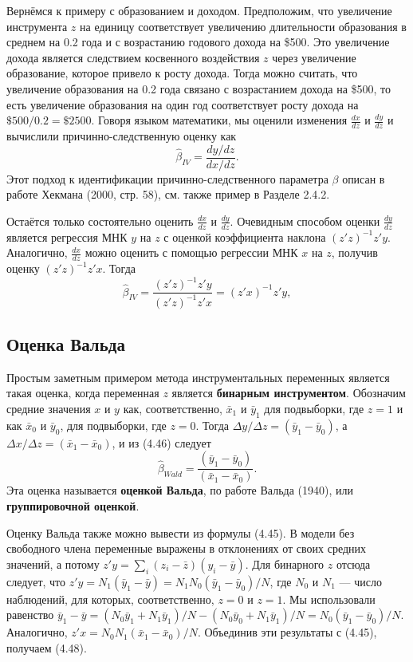 Вернёмся к примеру с образованием и доходом. Предположим, что увеличение инструмента $z$ на единицу соответствует  увеличению длительности образования в среднем на 0.2 года и с возрастанию годового дохода на \$500. Это увеличение дохода является следствием косвенного воздействия $z$ через увеличение образование, которое привело к росту дохода. Тогда можно считать, что увеличение образования на 0.2 года связано с возрастанием дохода на \$500, то есть увеличение образования на один год соответствует росту дохода на $\$500/0.2 = \$2500$. Говоря языком математики, мы оценили изменения $\frac{dx}{dz}$ и $\frac{dy}{dz}$ и вычислили причинно-следственную оценку как
\begin{equation}
\hat{\beta}_{IV} = \frac{dy/dz}{dx/dz}.
\end{equation}
Этот подход к идентификации причинно-следственного параметра $\beta$ описан в работе Хекмана (2000, стр. 58), см. также пример в Разделе 2.4.2.

Остаётся только состоятельно оценить $\frac{dx}{dz}$ и $\frac{dy}{dz}$. Очевидным способом оценки $\frac{dy}{dz}$ является регрессия МНК $y$ на $z$ с оценкой коэффициента наклона $(z'z)^{-1}z'y$. Аналогично, $\frac{dx}{dz}$ можно оценить с помощью регрессии МНК $x$ на $z$, получив оценку $(z'z)^{-1}z'x$. Тогда
\begin{equation}
\hat{\beta}_{IV} =\frac{(z'z)^{-1}z'y}{(z'z)^{-1}z'x} = (z'x)^{-1}z'y,
\end{equation}

\subsection{Оценка Вальда}
Простым заметным примером метода инструментальных переменных является такая оценка, когда переменная $z$ является \textbf{бинарным инструментом}. Обозначим средние значения $x$ и $y$ как, соответственно, $\bar{x}_1$ и $\bar{y}_1$ для подвыборки, где $z=1$ и как $\bar{x}_0$ и $\bar{y}_0$, для подвыборки, где $z=0$. Тогда $\Delta y /\Delta z = (\bar{y}_1-\bar{y}_0)$, а $\Delta x /\Delta z = (\bar{x}_1-\bar{x}_0)$, и из (4.46) следует 
\begin{equation}
\hat{\beta}_{Wald} = \frac{(\bar{y}_1-\bar{y}_0)}{(\bar{x}_1-\bar{x}_0)}.
\end{equation}
Эта оценка называется \textbf{оценкой Вальда}, по работе Вальда (1940), или \textbf{группировочной оценкой}.

Оценку Вальда также можно вывести из формулы (4.45). В модели без свободного члена переменные выражены в отклонениях от своих средних значений, а потому $z'y = \sum_i (z_i - \bar{z})(y_i - \bar{y})$. Для бинарного $z$ отсюда следует, что $z'y = N_1 (\bar{y}_1-\bar{y}) = N_1 N_0 (\bar{y}_1-\bar{y}_0)/N$, где $N_0$ и $N_1$ --- число наблюдений, для которых, соответственно, $z=0$ и $z=1$.  Мы использовали равенство $\bar{y}_1 - \bar{y} = (N_0 \bar{y}_1 + N_1 \bar{y}_1)/N - (N_0 \bar{y}_0 + N_1 \bar{y}_1)/N = N_0 (\bar{y}_1-\bar{y}_0)/N$. Аналогично, $z'x = N_0 N_1 (\bar{x}_1-\bar{x}_0)/N$. Объединив эти результаты с (4.45), получаем (4.48).

